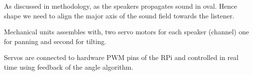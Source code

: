 \documentclass[../block_diagram_intro/block_diagram_intro.tex]{subfiles}
\begin{document}
    
As discussed in methodology, as the speakers propagates sound in oval. Hence shape we need to align 
the major axis of the sound field towards the listener.

Mechanical units assembles with, two servo motors for each speaker (channel)
one for panning and second for tilting.

Servos are connected to hardware PWM pins of the RPi and controlled in real time using feedback 
of the angle algorithm.
\end{document}
